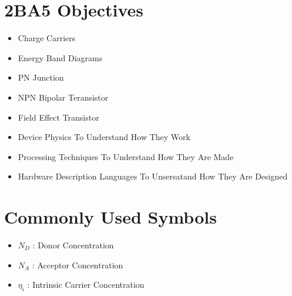 \documentclass[a4paper,12pt]{article}
\begin{document}



\section{2BA5 Objectives}

\begin{itemize}

\item
Charge Carriers

\item
Energy Band Diagrams

\item
PN Junction

\item
NPN Bipolar Teransistor

\item
Field Effect Transistor

\end{itemize}

\begin{itemize}

\item
Device Physics To Understand How They Work

\item
Processing Techniques To Understand How They Are Made

\item
Hardware Description Languages To Unsersatand How They Are Designed

\end{itemize}

\section{Commonly Used Symbols}

\begin{itemize}

\item
$N_{D}$ : Donor Concentration 

\item
$N_{A}$ : Acceptor Concentration

\item
$\eta_{i}$ : Intrinsic Carrier Concentration

\end{itemize}
\end{document}
